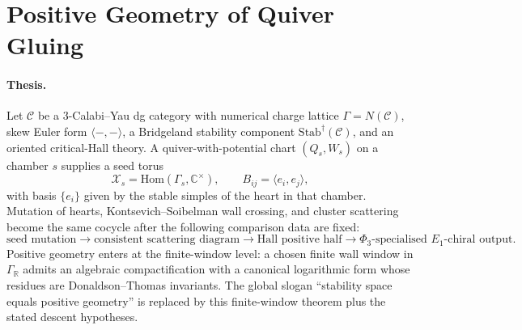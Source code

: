 
\providecommand{\K}{\mathbf{k}}
\providecommand{\Z}{\mathbb{Z}}
\providecommand{\Q}{\mathbb{Q}}
\providecommand{\R}{\mathbb{R}}
\providecommand{\C}{\mathbb{C}}
\providecommand{\bP}{\mathbb{P}}
\providecommand{\bT}{\mathbb{T}}
\providecommand{\cA}{\mathcal{A}}
\providecommand{\cC}{\mathcal{C}}
\providecommand{\cD}{\mathcal{D}}
\providecommand{\cH}{\mathcal{H}}
\providecommand{\cM}{\mathcal{M}}
\providecommand{\cO}{\mathcal{O}}
\providecommand{\cP}{\mathcal{P}}
\providecommand{\cU}{\mathcal{U}}
\providecommand{\cX}{\mathcal{X}}
\providecommand{\Db}{D^{b}}
\providecommand{\Coh}{\mathrm{Coh}}
\providecommand{\Perf}{\mathrm{Perf}}
\providecommand{\Ext}{\mathrm{Ext}}
\providecommand{\Hom}{\mathrm{Hom}}
\providecommand{\Rep}{\mathrm{Rep}}
\providecommand{\Stab}{\mathrm{Stab}}
\providecommand{\CoHA}{\mathrm{CoHA}}
\providecommand{\Yplus}{Y^{+}}
\providecommand{\Jac}{\mathrm{Jac}}
\providecommand{\HN}{\mathrm{HN}}
\providecommand{\Tr}{\mathrm{Tr}}
\providecommand{\Aut}{\mathrm{Aut}}
\providecommand{\SpCh}{\mathrm{SpCh}}
\providecommand{\PhiFA}{\Phi^{\mathrm{FA}}}
\providecommand{\kch}{\kappa_{\mathrm{ch}}}
\providecommand{\kcat}{\kappa_{\mathrm{cat}}}
\providecommand{\kBKM}{\kappa_{\mathrm{BKM}}}
\providecommand{\kfib}{\kappa_{\mathrm{fiber}}}

\section*{Positive Geometry of Quiver Gluing}
\label{sec:positive-geometry-cluster}

\paragraph{Thesis.}
Let $\cC$ be a $3$-Calabi--Yau dg category with numerical charge
lattice $\Gamma=N(\cC)$, skew Euler form
$\langle-,-\rangle$, a Bridgeland stability component
$\Stab^\dagger(\cC)$, and an oriented critical-Hall theory. A
quiver-with-potential chart $(Q_s,W_s)$ on a chamber $s$ supplies a seed
torus
\[
  \cX_s=\Hom(\Gamma_s,\C^\times),
  \qquad
  B_{ij}=\langle e_i,e_j\rangle ,
\]
with basis $\{e_i\}$ given by the stable simples of the heart in that
chamber. Mutation of hearts, Kontsevich--Soibelman wall crossing, and
cluster scattering become the same cocycle after the following
comparison data are fixed:
\[
  \text{seed mutation}
  \longrightarrow
  \text{consistent scattering diagram}
  \longrightarrow
  \text{Hall positive half}
  \longrightarrow
  \Phi_3\text{-specialised }E_{1}\text{-chiral output}.
\]
Positive geometry enters at the finite-window level: a chosen finite
wall window in $\Gamma_\R$ admits an algebraic compactification with a
canonical logarithmic form whose residues are Donaldson--Thomas
invariants. The global slogan ``stability space equals positive
geometry'' is replaced by this finite-window theorem plus the stated
descent hypotheses.

